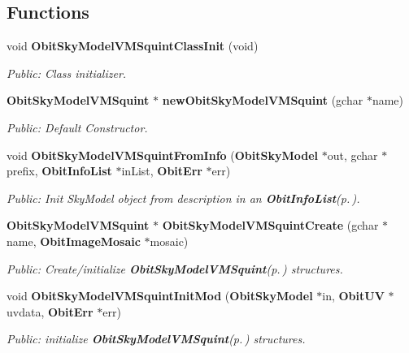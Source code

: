 \subsection*{Functions}
\begin{CompactItemize}
\item 
void {\bf Obit\-Sky\-Model\-VMSquint\-Class\-Init} (void)
\begin{CompactList}\small\item\em Public: Class initializer. \item\end{CompactList}\item 
{\bf Obit\-Sky\-Model\-VMSquint} $\ast$ {\bf new\-Obit\-Sky\-Model\-VMSquint} (gchar $\ast$name)
\begin{CompactList}\small\item\em Public: Default Constructor. \item\end{CompactList}\item 
void {\bf Obit\-Sky\-Model\-VMSquint\-From\-Info} ({\bf Obit\-Sky\-Model} $\ast$out, gchar $\ast$prefix, {\bf Obit\-Info\-List} $\ast$in\-List, {\bf Obit\-Err} $\ast$err)
\begin{CompactList}\small\item\em Public: Init Sky\-Model object from description in an {\bf Obit\-Info\-List}{\rm (p.\,\pageref{structObitInfoList})}. \item\end{CompactList}\item 
{\bf Obit\-Sky\-Model\-VMSquint} $\ast$ {\bf Obit\-Sky\-Model\-VMSquint\-Create} (gchar $\ast$name, {\bf Obit\-Image\-Mosaic} $\ast$mosaic)
\begin{CompactList}\small\item\em Public: Create/initialize {\bf Obit\-Sky\-Model\-VMSquint}{\rm (p.\,\pageref{structObitSkyModelVMSquint})} structures. \item\end{CompactList}\item 
void {\bf Obit\-Sky\-Model\-VMSquint\-Init\-Mod} ({\bf Obit\-Sky\-Model} $\ast$in, {\bf Obit\-UV} $\ast$uvdata, {\bf Obit\-Err} $\ast$err)
\begin{CompactList}\small\item\em Public: initialize {\bf Obit\-Sky\-Model\-VMSquint}{\rm (p.\,\pageref{structObitSkyModelVMSquint})} structures. \item\end{CompactList}\item 

\end{CompactItemize}
